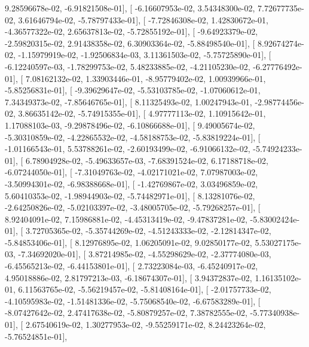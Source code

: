 \documentclass{article}
\begin{document}
          9.28596678e-02,  -6.91821508e-01],
       [ -6.16607953e-02,   3.54348300e-02,   7.72677735e-02,
          3.61646794e-02,  -5.78797433e-01],
       [ -7.72846308e-02,   1.42830672e-01,  -4.36577322e-02,
          2.65637813e-02,  -5.72855192e-01],
       [ -9.64923379e-02,  -2.59820315e-02,   2.91438358e-02,
          6.30903364e-02,  -5.88498540e-01],
       [  8.92674274e-02,  -1.15979919e-02,  -1.92506834e-03,
          3.11361503e-02,  -5.75725890e-01],
       [ -6.12240597e-03,  -1.78299753e-02,   5.48233885e-02,
         -4.21105230e-02,  -6.27776492e-01],
       [  7.08162132e-02,   1.33903446e-01,  -8.95779402e-02,
          1.00939966e-01,  -5.85256831e-01],
       [ -9.39629647e-02,  -5.53103785e-02,  -1.07060612e-01,
          7.34349373e-02,  -7.85646765e-01],
       [  8.11325493e-02,   1.00247943e-01,  -2.98774456e-02,
          3.86635142e-02,  -5.74915355e-01],
       [  4.97777113e-02,   1.10915642e-01,   1.17088103e-03,
         -9.29878496e-02,  -6.10866688e-01],
       [  9.49005674e-02,  -5.30310859e-02,  -4.22865532e-02,
         -4.58188753e-02,  -5.83819224e-01],
       [ -1.01166543e-01,   5.53788261e-02,  -2.60193499e-02,
         -6.91066132e-02,  -5.74924233e-01],
       [  6.78904928e-02,  -5.49633657e-03,  -7.68391524e-02,
          6.17188718e-02,  -6.07244050e-01],
       [ -7.31049763e-02,  -4.02171021e-02,   7.07987003e-02,
         -3.50994301e-02,  -6.98388668e-01],
       [ -1.42769867e-02,   3.03496859e-02,   5.60410353e-02,
         -1.98944903e-02,  -5.74482971e-01],
       [  8.13281076e-02,  -2.64250826e-02,  -5.02103397e-02,
         -3.48005705e-02,  -5.79268257e-01],
       [  8.92404091e-02,   7.15986881e-02,  -4.45313419e-02,
         -9.47837281e-02,  -5.83002424e-01],
       [  3.72705365e-02,  -5.35744269e-02,  -4.51243333e-02,
         -2.12814347e-02,  -5.84853406e-01],
       [  8.12976895e-02,   1.06205091e-02,   9.02850177e-02,
          5.53027175e-03,  -7.34692020e-01],
       [  3.87214985e-02,  -4.55298629e-02,  -2.37774080e-03,
         -6.45565213e-02,  -6.44153801e-01],
       [  2.73223084e-03,  -6.45240917e-02,   4.95018886e-02,
          2.81797213e-03,  -6.18674307e-01],
       [  3.94372837e-02,   1.16135102e-01,   6.11563765e-02,
         -5.56219457e-02,  -5.81408164e-01],
       [ -2.01757733e-02,  -4.10595983e-02,  -1.51481336e-02,
         -5.75068540e-02,  -6.67583289e-01],
       [ -8.07427642e-02,   2.47417638e-02,  -5.80879257e-02,
          7.38782555e-02,  -5.77340938e-01],
       [  2.67540619e-02,   1.30277953e-02,  -9.55259171e-02,
          8.24423264e-02,  -5.76524851e-01],
\end{document}
